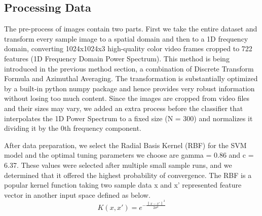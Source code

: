 \documentclass[11pt,twocolumn,letterpaper]{article}
\newcommand{\norm}[1]{\left\lVert#1\right\rVert}
\begin{document}
\subsection{Processing Data}
The pre-process of images contain two parts. First we take the entire dataset and transform every sample image to a spatial domain and then to a 1D frequency domain, converting 1024x1024x3 high-quality color video frames cropped to 722 features (1D Frequency Domain Power Spectrum). This method is being introduced in the previous method section, a combination of Discrete Transform Formula and Azimuthal Averaging. The transformation is substantially optimized by a built-in python numpy package and hence provides very robust information without losing too much content.
Since the images are cropped from video files and their sizes may vary, we added an extra process before the classifier that interpolates the 1D Power Spectrum to a fixed size (N = 300) and normalizes it dividing it by the 0th frequency component.\par
After data preparation, we select the Radial Basis Kernel (RBF) \cite{JMLR:v11:chang10a} for the SVM model and the optimal tuning parameters we choose are gamma = 0.86 and c = 6.37. These values were selected after multiple small sample runs, and we determined that it offered the highest probability of convergence. The RBF is a popular kernel function taking two sample data  x and x' represented feature vector in another input space defined as below.
$$K(x, x') = e^{-\frac{\norm{x-x'}^2}{2\sigma^2}}$$
\end{document}

